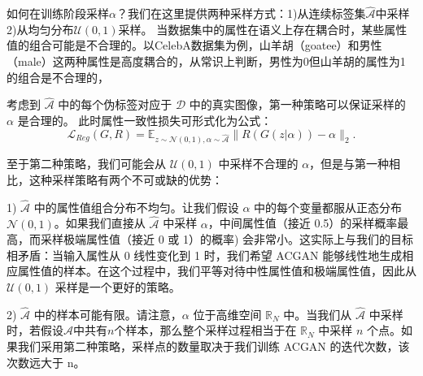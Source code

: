 如何在训练阶段采样$\alpha$？我们在这里提供两种采样方式：1)从连续标签集$\hat{\mathcal{A}}$中采样 2)从均匀分布$\mathcal{U}(0,1)$采样。
当数据集中的属性在语义上存在耦合时，某些属性值的组合可能是不合理的。以CelebA数据集为例，山羊胡（goatee）和男性（male）这两种属性是高度耦合的，从常识上判断，男性为0但山羊胡的属性为1的组合是不合理的，

考虑到 $\hat{\mathcal{A}}$ 中的每个伪标签对应于 $\mathcal{D}$ 中的真实图像，第一种策略可以保证采样的 $\alpha$ 是合理的。
此时属性一致性损失可形式化为公式：
\begin{equation}
   \mathcal{L}_{Reg}(G, R)  =  \mathbb{E}_{z \sim \mathcal{N}(0,1), \alpha \sim \hat{\mathcal{A}}}\|R(G(z|\alpha)) - \alpha\|_2.
\end{equation}

至于第二种策略，我们可能会从 $\mathcal{U}(0,1)$ 中采样不合理的 $\alpha$，但是与第一种相比，这种采样策略有两个不可或缺的优势：

1) $\hat{\mathcal{A}}$ 中的属性值组合分布不均匀。让我们假设 $\alpha$ 中的每个变量都服从正态分布 $\mathcal{N}(0,1)$。如果我们直接从 $\hat{\mathcal{A}}$ 中采样 $\alpha$，中间属性值（接近 0.5）的采样概率最高，而采样极端属性值（接近 0 或 1）的概率) 会非常小。这实际上与我们的目标相矛盾：当输入属性从 0 线性变化到 1 时，我们希望 ACGAN 能够线性地生成相应属性值的样本。在这个过程中，我们平等对待中性属性值和极端属性值，因此从 $\mathcal{U}(0,1)$ 采样是一个更好的策略。

2) $\hat{\mathcal{A}}$ 中的样本可能有限。请注意，$\alpha$ 位于高维空间 $\mathbb{R}_N$ 中。当我们从 $\hat{\mathcal{A}}$ 中采样时，若假设${\mathcal{A}}$中共有$n$个样本，那么整个采样过程相当于在 $\mathbb{R}_N$ 中采样 $n$ 个点。如果我们采用第二种策略，采样点的数量取决于我们训练 ACGAN 的迭代次数，该次数远大于 n。

